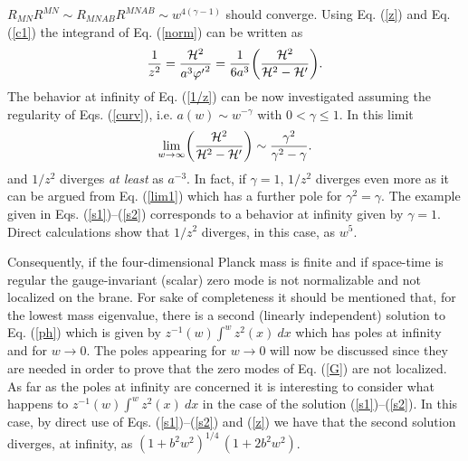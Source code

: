 \documentclass[a4paper,12pt]{article}
\begin{document}
$R_{M N}R^{M N} \sim R_{M N A B} R^{M N A B } \sim 
w^{4 ( \gamma - 1)}$ should converge.
Using  Eq. (\ref{z}) and Eq. (\ref{c1}) the integrand of Eq. (\ref{norm})
can be written as 
\begin{equation}
\frac{1}{z^2} = \frac{{\cal H}^2}{a^3 {\varphi'}^2} = \frac{1}{6a^3}
\biggl(\frac{{\cal H}^2}{ {\cal H}^2 - {\cal H}'}\biggr).
\label{1/z}
\end{equation}
The behavior at infinity of Eq. (\ref{1/z}) can be now investigated assuming
the regularity of Eqs. (\ref{curv}), i.e. 
 $a(w) \sim w^{-\gamma}$ with $0< \gamma \leq 1$. In this limit 
\begin{equation}
\lim_{w\rightarrow \infty} \biggl(\frac{{\cal H}^2}{{\cal H}^2 
- {\cal H}'} \biggr)\sim \frac{\gamma^2}{\gamma^2 -\gamma} .
\label{lim1}
\end{equation}
and $1/z^2$ diverges {\em at least} as $a^{-3}$. In fact, if  $\gamma =1$, 
$1/z^2$ diverges even more as it can be argued from Eq. (\ref{lim1}) which 
has a further pole for $\gamma^2 = \gamma$. 
The  example given in Eqs. (\ref{s1})--(\ref{s2}) corresponds to 
a behavior at infinity given by $\gamma=1$.  
Direct calculations show that $1/z^2$ diverges, in this case,  as $w^5$.

Consequently, if the four-dimensional Planck mass is finite and if 
space-time is  regular the gauge-invariant (scalar) 
 zero mode is not normalizable and not localized on the brane.
For sake of completeness it should be mentioned that, for the lowest 
mass eigenvalue, 
there is a second (linearly independent) solution to Eq. (\ref{ph}) 
which is given by $ z^{-1}(w) \int^{w} z^2(x) ~dx$ which has poles at 
infinity and for $w\rightarrow 0$.
The poles appearing for $w\rightarrow 0$
will now be discussed since they are needed in order to prove that 
the zero modes of Eq. (\ref{G}) are not localized. As far as the poles 
 at infinity are concerned it is interesting to consider 
what happens to  
$ z^{-1}(w) \int^{w} z^2(x) ~dx$ in the case of the solution 
(\ref{s1})--(\ref{s2}). In this case, by direct use of Eqs. 
(\ref{s1})--(\ref{s2}) and (\ref{z}) we have that the second solution
diverges, at infinity, as $ (1 + b^2 w^2)^{1/4}\, (1 + 2 b^2 w^2)$. 
\end{document}
